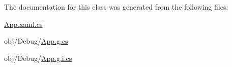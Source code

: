 The documentation for this class was generated from the following files\+:\begin{DoxyCompactItemize}
\item 
\mbox{\hyperlink{_app_8xaml_8cs}{App.\+xaml.\+cs}}\item 
obj/\+Debug/\mbox{\hyperlink{_app_8g_8cs}{App.\+g.\+cs}}\item 
obj/\+Debug/\mbox{\hyperlink{_app_8g_8i_8cs}{App.\+g.\+i.\+cs}}\end{DoxyCompactItemize}
